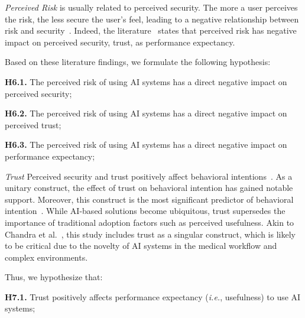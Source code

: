 {\it Perceived Risk} is usually related to perceived security.
The more a user perceives the risk, the less secure the user's feel, leading to a negative relationship between risk and security~\cite{KHALILZADEH2017460}.
Indeed, the literature~\cite{SHIN20091343, Thakur2014} states that perceived risk has negative impact on perceived security, trust, as performance expectancy.

\vspace{2.25mm}

\noindent
Based on these literature findings, we formulate the following hypothesis:

\vspace{2.25mm}

\noindent
{\bf H6.1.} The perceived risk of using AI systems has a direct negative impact on perceived security;

\vspace{2.25mm}

\noindent
{\bf H6.2.} The perceived risk of using AI systems has a direct negative impact on perceived trust;

\vspace{2.25mm}

\noindent
{\bf H6.3.} The perceived risk of using AI systems has a direct negative impact on performance expectancy;

\vspace{2.25mm}

{\it Trust} Perceived security and trust positively affect behavioral intentions~\cite{SHIN20091343}.
As a unitary construct, the effect of trust on behavioral intention has gained notable support.
Moreover, this construct is the most significant predictor of behavioral intention~\cite{chandra2010evaluating, SHIN20091343}.
While AI-based solutions become ubiquitous, trust supersedes the importance of traditional adoption factors such as perceived usefulness.
Akin to Chandra et al.~\cite{chandra2010evaluating}, this study includes trust as a singular construct, which is likely to be critical due to the novelty of AI systems in the medical workflow and complex environments.

\vspace{2.25mm}

\noindent
Thus, we hypothesize that:

\vspace{2.25mm}

\noindent
{\bf H7.1.} Trust positively affects performance expectancy ({\it i.e.}, usefulness) to use AI systems;

